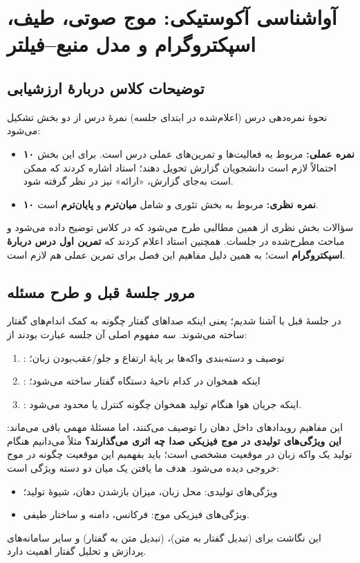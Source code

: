 \chapter{آواشناسی آکوستیکی: موج صوتی، طیف، اسپکتروگرام و مدل منبع--فیلتر}

\section{توضیحات کلاس دربارهٔ ارزشیابی}

\begin{exambox}{نحوهٔ نمره‌دهی درس (اعلام‌شده در ابتدای جلسه)}
نمرهٔ درس از دو بخش تشکیل می‌شود:
\begin{itemize}
  \item \textbf{۱۰ نمره عملی:} مربوط به فعالیت‌ها و تمرین‌های عملی درس است. برای این بخش احتمالاً لازم است دانشجویان گزارش تحویل دهند؛ استاد اشاره کردند که ممکن است به‌جای گزارش، «ارائه» نیز در نظر گرفته شود.
  \item \textbf{۱۰ نمره نظری:} مربوط به بخش تئوری و شامل \textbf{میان‌ترم} و \textbf{پایان‌ترم} است.
\end{itemize}
سؤالات بخش نظری از همین مطالبی طرح می‌شود که در کلاس توضیح داده می‌شود و مباحث مطرح‌شده در جلسات. همچنین استاد اعلام کردند که \textbf{تمرین اول درس دربارهٔ اسپکتروگرام} است؛ به همین دلیل مفاهیم این فصل برای تمرین عملی هم لازم است.
\end{exambox}

\section{مرور جلسهٔ قبل و طرح مسئله}

در جلسهٔ قبل با  آشنا شدیم؛ یعنی اینکه صداهای گفتار چگونه به کمک اندام‌های گفتار ساخته می‌شوند. سه مفهوم اصلی آن جلسه عبارت بودند از:
\begin{enumerate}
  \item {}: توصیف و دسته‌بندی واکه‌ها بر پایهٔ ارتفاع و جلو/عقب‌بودن زبان؛
  \item {}: اینکه همخوان در کدام ناحیهٔ دستگاه گفتار ساخته می‌شود؛
  \item {}: اینکه جریان هوا هنگام تولید همخوان چگونه کنترل یا محدود می‌شود.
\end{enumerate}

این مفاهیم رویدادهای داخل دهان را توصیف می‌کنند، اما مسئلهٔ مهمی باقی می‌ماند: \textbf{این ویژگی‌های تولیدی در موج فیزیکی صدا چه اثری می‌گذارند؟} مثلاً می‌دانیم هنگام تولید یک واکه زبان در موقعیت مشخصی است؛ باید بفهمیم این موقعیت چگونه در موج خروجی دیده می‌شود. هدف ما یافتن یک  میان دو دسته ویژگی است:
\begin{itemize}
  \item ویژگی‌های تولیدی: محل زبان، میزان بازشدن دهان، شیوهٔ تولید؛
  \item ویژگی‌های فیزیکی موج: فرکانس، دامنه و ساختار طیفی.
\end{itemize}
این نگاشت برای  (تبدیل گفتار به متن)،  (تبدیل متن به گفتار) و سایر سامانه‌های پردازش و تحلیل گفتار اهمیت دارد.


